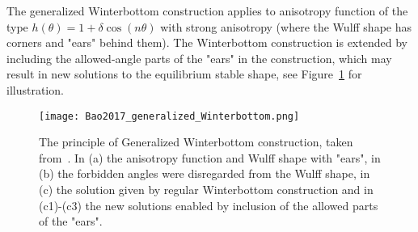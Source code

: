 The generalized Winterbottom construction applies to anisotropy function of the type $h(\theta)=1+\delta\cos(n\theta)$ with strong anisotropy (where the Wulff shape has corners and "ears" behind them). The Winterbottom construction is extended by including the allowed-angle parts of the "ears" in the construction, which may result in new solutions to the equilibrium stable shape, see Figure~\ref{fig_generalized_Winterbottom} for illustration.
\begin{figure}
	\centering
	\texttt{[image: Bao2017\_generalized\_Winterbottom.png]}
	\caption[Generalized Winterbottom construction]{The principle of Generalized Winterbottom construction, taken from~\cite{Bao2017}. In (a) the anisotropy function and Wulff shape with "ears", in (b) the forbidden angles were disregarded from the Wulff shape, in (c) the solution given by regular Winterbottom construction and in (c1)-(c3) the new solutions enabled by inclusion of the allowed parts of the "ears".}
	\label{fig_generalized_Winterbottom}
\end{figure}



%

